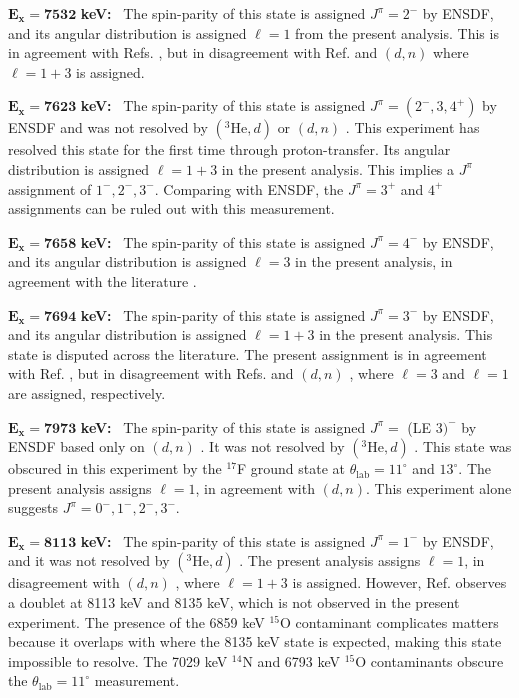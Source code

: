 \emph{$\mathbf{E_{x} = 7532}$} \textbf{keV:} \, 
The spin-parity of this state is assigned $J^{\pi} = 2^{-}$ by ENSDF, and its angular distribution is assigned $\ell=1$ from the present analysis. This is in agreement with Refs. \cite{Erskine1966,Cage1971}, but in disagreement with Ref. \cite{Seth1967} and $(d,n)$ \cite{Fuchs1969} where $\ell=1+3$ is assigned.

\emph{$\mathbf{E_{x} = 7623}$} \textbf{keV:} \, 
The spin-parity of this state is assigned $J^{\pi} = (2^{-},3,4^{+})$ by ENSDF and was not resolved by $(^{3}\mathrm{He},d)$ \cite{Erskine1966,Seth1967,Cage1971} or $(d,n)$ \cite{Fuchs1969}. This experiment has resolved this state for the first time through proton-transfer. Its angular distribution is assigned $\ell=1+3$ in the present analysis. This implies a $J^{\pi}$ assignment of $1^{-},2^{-},3^{-}$. Comparing with ENSDF, the $J^{\pi} = 3^{+}$ and $4^{+}$ assignments can be ruled out with this measurement.

\emph{$\mathbf{E_{x} = 7658}$} \textbf{keV:} \, 
The spin-parity of this state is assigned $J^{\pi} = 4^{-}$ by ENSDF, and its angular distribution is assigned $\ell=3$ in the present analysis, in agreement with the literature \cite{Erskine1966,Seth1967,Cage1971,Fuchs1969}.

\emph{$\mathbf{E_{x} = 7694}$} \textbf{keV:} \, 
The spin-parity of this state is assigned $J^{\pi} = 3^{-}$ by ENSDF, and its angular distribution is assigned $\ell=1+3$ in the present analysis. This state is disputed across the literature. The present assignment is in agreement with Ref. \cite{Erskine1966}, but in disagreement with Refs. \cite{Seth1967,Cage1971} and $(d,n)$ \cite{Fuchs1969}, where $\ell=3$ and $\ell=1$ are assigned, respectively.

\emph{$\mathbf{E_{x} = 7973}$} \textbf{keV:} \, 
The spin-parity of this state is assigned $J^{\pi} =$ (LE $3)^{-}$ by ENSDF based only on $(d,n)$ \cite{Fuchs1969}. It was not resolved by $(^{3}\mathrm{He},d)$ \cite{Erskine1966,Seth1967,Cage1971}. This state was obscured in this experiment by the $^{17}$F ground state at $\theta_{\mathrm{lab}} = 11^{\circ}$ and $13^{\circ}$. The present analysis assigns $\ell=1$, in agreement with $(d,n)$. This experiment alone suggests $J^{\pi} = 0^{-}, 1^{-}, 2^{-}, 3^{-}$.

\emph{$\mathbf{E_{x} = 8113}$} \textbf{keV:} \, 
The spin-parity of this state is assigned $J^{\pi} = 1^{-}$ by ENSDF, and it was not resolved by $(^{3}\mathrm{He},d)$ \cite{Erskine1966,Seth1967,Cage1971}. The present analysis assigns $\ell=1$, in disagreement with $(d,n)$ \cite{Fuchs1969}, where $\ell=1+3$ is assigned. However, Ref. \cite{Fuchs1969} observes a doublet at 8113 keV and 8135 keV, which is not observed in the present experiment. The presence of the 6859 keV $^{15}$O contaminant complicates matters because it overlaps with where the 8135 keV state is expected, making this state impossible to resolve. The 7029 keV $^{14}$N and 6793 keV $^{15}$O contaminants obscure the $\theta_{\mathrm{lab}} = 11^{\circ}$ measurement.

